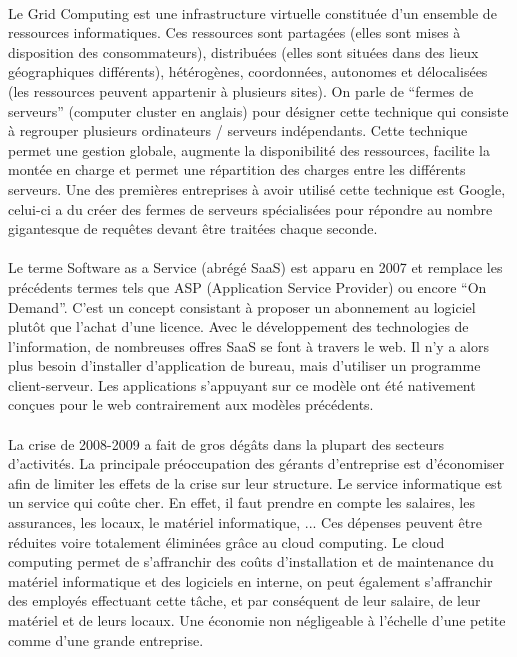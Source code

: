 \documentclass[a4paper,12pt]{report}
\begin{document}
\begin{onehalfspace}
	\paragraph*{}
	Le Grid Computing est une infrastructure virtuelle constituée d’un ensemble de ressources informatiques. Ces ressources sont partagées (elles sont mises à disposition des consommateurs), distribuées (elles sont situées dans des lieux géographiques différents), hétérogènes, coordonnées, autonomes et délocalisées (les ressources peuvent appartenir à plusieurs sites). On parle de “fermes de serveurs” (computer cluster en anglais) pour désigner cette technique qui consiste à regrouper plusieurs ordinateurs / serveurs indépendants. Cette technique permet une gestion globale, augmente la disponibilité des ressources, facilite la montée en charge et permet une répartition des charges entre les différents serveurs.
	Une des premières entreprises à avoir utilisé cette technique est Google, celui-ci a du créer des fermes de serveurs spécialisées pour répondre au nombre gigantesque de requêtes devant être traitées chaque seconde.
	
	\paragraph*{}
	Le terme Software as a Service (abrégé SaaS) est apparu en 2007 et remplace les précédents termes tels que ASP (Application Service Provider) ou encore “On Demand”.
	C’est un concept consistant à proposer un abonnement au logiciel plutôt que l’achat d’une licence. Avec le développement des technologies de l’information, de nombreuses offres SaaS se font à travers le web. Il n’y a alors plus besoin d’installer d’application de bureau, mais d’utiliser un programme client-serveur.
	Les applications s’appuyant sur ce modèle ont été nativement conçues pour le web contrairement aux modèles précédents.
	
	\paragraph*{}
	La crise de 2008-2009 a fait de gros dégâts dans la plupart des secteurs d’activités. La principale préoccupation des gérants d’entreprise est d’économiser afin de limiter les effets de la crise sur leur structure. Le service informatique est un service qui coûte cher. En effet, il faut prendre en compte les salaires, les assurances, les locaux, le matériel informatique, ... Ces dépenses peuvent être réduites voire totalement éliminées grâce au cloud computing. Le cloud computing permet de s'affranchir des coûts d'installation et de maintenance du matériel informatique et des logiciels en interne, on peut également s'affranchir des employés effectuant cette tâche, et par conséquent de leur salaire, de leur matériel et de leurs locaux. Une économie non négligeable à l'échelle d'une petite comme d'une grande entreprise.


\end{onehalfspace}
\end{document}
